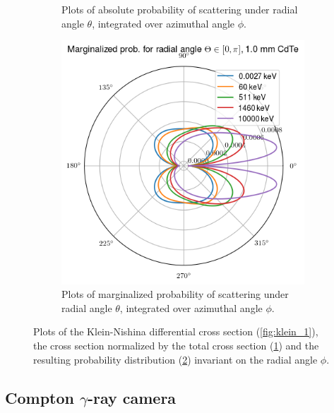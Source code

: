 \documentclass[a4paper,12pt,titlepage, twoside]{article}
\begin{document}
\begin{figure}[ht]
\begin{subfigure}{0.32\textwidth}
    \caption{Plots of absolute probability of scattering under radial angle $\theta$, integrated over azimuthal angle $\phi$.}
    \label{fig:klein_2}
  \end{subfigure}
  \begin{subfigure}{0.32\textwidth}
    \includegraphics[width=1.0\textwidth]{./fig/klein_nishina_3.png}
    \caption{Plots of marginalized probability of scattering under radial angle $\theta$, integrated over azimuthal angle $\phi$.}
    \label{fig:klein_3}
  \end{subfigure}
  \caption{Plots of the Klein-Nishina differential cross section (\ref{fig:klein_1}), the cross section normalized by the total cross section (\ref{fig:klein_2}) and the resulting probability distribution (\ref{fig:klein_3}) invariant on the radial angle $\phi$.}
  \label{fig:klein_nishina}
\end{figure}



\subsection{Compton $\gamma$-ray camera}


\end{document}

